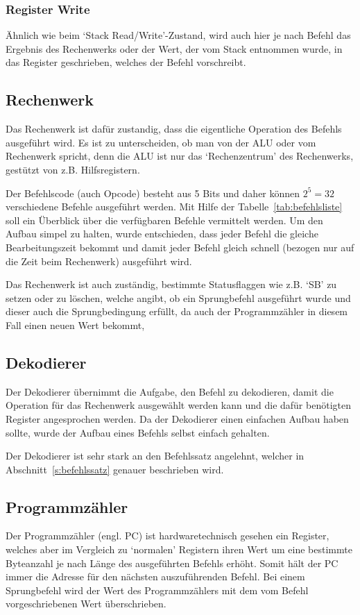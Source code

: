 \subsubsection{Register Write}
Ähnlich wie beim `Stack Read/Write'-Zustand, wird auch hier je nach Befehl das
Ergebnis des Rechenwerks oder der Wert, der vom Stack entnommen wurde, in das
Register geschrieben, welches der Befehl vorschreibt.
\subsection{Rechenwerk}
\label{s:alu}
Das Rechenwerk ist dafür zustandig, dass die eigentliche Operation des Befehls
ausgeführt wird. Es ist zu unterscheiden, ob man von der \ac{ALU} oder vom
Rechenwerk spricht, denn die \ac{ALU} ist nur das `Rechenzentrum' des
Rechenwerks, gestützt von z.B. Hilfsregistern.

Der Befehlscode (auch Opcode) besteht aus 5 Bits und daher können $2^{5} = 32$
verschiedene Befehle ausgeführt werden. Mit Hilfe der
Tabelle~\ref{tab:befehlsliste} soll ein Überblick über die verfügbaren Befehle
vermittelt werden. Um den Aufbau simpel zu halten, wurde entschieden, dass jeder
Befehl die gleiche Bearbeitungszeit bekommt und damit jeder Befehl gleich
schnell (bezogen nur auf die Zeit beim Rechenwerk) ausgeführt wird.

Das Rechenwerk ist auch zuständig, bestimmte Statusflaggen wie z.B. `SB' zu
setzen oder zu löschen, welche angibt, ob ein Sprungbefehl ausgeführt wurde und
dieser auch die Sprungbedingung erfüllt, da auch der Programmzähler in diesem
Fall einen neuen Wert bekommt,
\clearpage
\pagebreak
\subsection{Dekodierer}
\label{s:decode}
Der Dekodierer übernimmt die Aufgabe, den Befehl zu dekodieren, damit die
Operation für das Rechenwerk ausgewählt werden kann und die dafür benötigten
Register angesprochen werden. Da der Dekodierer einen einfachen Aufbau haben
sollte, wurde der Aufbau eines Befehls selbst einfach gehalten.

Der Dekodierer ist sehr stark an den Befehlssatz angelehnt, welcher in
Abschnitt~\ref{s:befehlssatz} genauer beschrieben wird.
\subsection{Programmzähler}
\label{s:pc}
Der Programmzähler (engl. \ac{PC}) ist hardwaretechnisch gesehen ein Register,
welches aber im Vergleich zu `normalen' Registern ihren Wert um eine bestimmte
Byteanzahl je nach Länge des ausgeführten Befehls erhöht. Somit hält der \ac{PC}
immer die Adresse für den nächsten auszuführenden Befehl. Bei einem Sprungbefehl
wird der Wert des Programmzählers mit dem vom Befehl vorgeschriebenen Wert
überschrieben.

